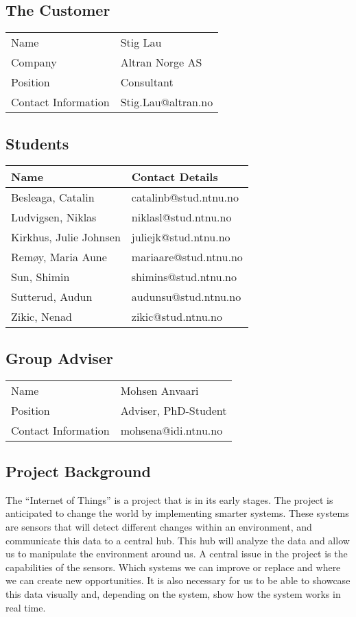 ﻿\documentclass[../document.tex]{subfiles}
\begin{document}
\subsection{The Customer}
\begin{tabular}{ll}
\hline
Name					&	Stig Lau\\
Company				&	Altran Norge AS\\
Position				&	Consultant\\
Contact Information		&	Stig.Lau@altran.no\\
\hline
\end{tabular}

\subsection{Students}
\begin{tabular}{ll}
\hline
Name				&	Contact Details\\ \hline
Besleaga, Catalin		&	catalinb@stud.ntnu.no\\
Ludvigsen, Niklas		&	niklasl@stud.ntnu.no\\
Kirkhus, Julie Johnsen	&	juliejk@stud.ntnu.no\\
Remøy, Maria Aune		&	mariaare@stud.ntnu.no\\
Sun, Shimin			&	shimins@stud.ntnu.no\\
Sutterud, Audun		&	audunsu@stud.ntnu.no\\
Zikic, Nenad			&	zikic@stud.ntnu.no\\
\hline
\end{tabular}

\subsection{Group Adviser}
\begin{tabular}{ll}
\hline
Name				&	Mohsen Anvaari\\
Position			&	Adviser, PhD-Student\\
Contact Information	&	mohsena@idi.ntnu.no\\
\hline
\end{tabular}

\subsection{Project Background}
The ``Internet of Things'' is a project that is in its early stages. The project is anticipated to change the world by implementing smarter systems. These systems are sensors that will detect different changes within an environment, and communicate this data to a central hub. This hub will analyze the data and allow us to manipulate the environment around us. A central issue in the project is the capabilities of the sensors. Which systems we can improve or replace and where we can create new opportunities. It is also necessary for us to be able to showcase this data visually and, depending on the system, show how the system works in real time.
\end{document}
